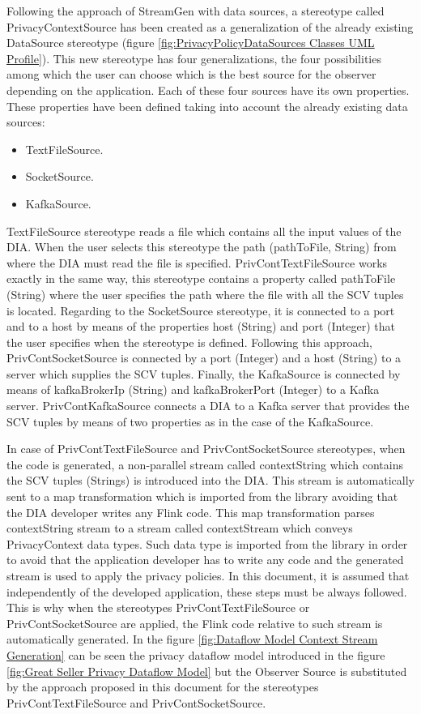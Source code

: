 Following the approach of StreamGen with data sources, a stereotype called PrivacyContextSource has been created as a generalization of the already existing DataSource stereotype (figure \ref{fig:PrivacyPolicyDataSources Classes UML Profile}). This new stereotype has four generalizations, the four possibilities among which the user can choose which is the best source for the observer depending on the application. Each of these four sources have its own properties. These properties have been defined taking into account the already existing data sources:

\begin{itemize}
\item TextFileSource.
\item SocketSource.
\item KafkaSource.
\end{itemize}

TextFileSource stereotype reads a file which contains all the input values of the DIA. When the user selects this stereotype the path (pathToFile, String) from where the DIA must read the file is specified. PrivContTextFileSource works exactly in the same way, this stereotype contains a property called pathToFile (String) where the user specifies the path where the file with all the SCV tuples is located. Regarding to the SocketSource stereotype, it is connected to a port and to a host by means of the properties host (String) and port (Integer) that the user specifies when the stereotype is defined. Following this approach, PrivContSocketSource is connected by a port (Integer) and a host (String) to a server which supplies the SCV tuples. Finally, the KafkaSource is connected by means of kafkaBrokerIp (String) and kafkaBrokerPort (Integer) to a Kafka server. PrivContKafkaSource connects a DIA to a Kafka server that provides the SCV tuples by means of two properties as in the case of the KafkaSource.

In case of PrivContTextFileSource and PrivContSocketSource stereotypes, when the code is generated, a non-parallel stream called contextString which contains the SCV tuples (Strings) is introduced into the DIA. This stream is automatically sent to a map transformation which is imported from the library avoiding that the DIA developer writes any Flink code. This map transformation parses contextString stream to a stream called contextStream which conveys PrivacyContext data types. Such data type is imported from the library in order to avoid that the application developer has to write any code and the generated stream is used to apply the privacy policies. In this document, it is assumed that independently of the developed application, these steps must be always followed. This is why when the stereotypes PrivContTextFileSource or PrivContSocketSource are applied, the Flink code relative to such stream is automatically generated. In the figure \ref{fig:Dataflow Model Context Stream Generation} can be seen the privacy dataflow model introduced in the figure \ref{fig:Great Seller Privacy Dataflow Model} but the Observer Source is substituted by the approach proposed in this document for the stereotypes PrivContTextFileSource and PrivContSocketSource.


